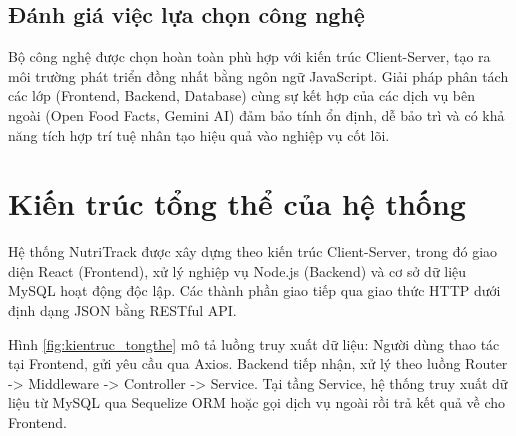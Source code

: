 \documentclass[12pt, a4paper]{report}
\begin{document}
\subsection{Đánh giá việc lựa chọn công nghệ}
Bộ công nghệ được chọn hoàn toàn phù hợp với kiến trúc Client-Server, tạo ra môi trường phát triển đồng nhất bằng ngôn ngữ JavaScript. Giải pháp phân tách các lớp (Frontend, Backend, Database) cùng sự kết hợp của các dịch vụ bên ngoài (Open Food Facts, Gemini AI) đảm bảo tính ổn định, dễ bảo trì và có khả năng tích hợp trí tuệ nhân tạo hiệu quả vào nghiệp vụ cốt lõi.

\section{Kiến trúc tổng thể của hệ thống}
Hệ thống NutriTrack được xây dựng theo kiến trúc Client-Server, trong đó giao diện React (Frontend), xử lý nghiệp vụ Node.js (Backend) và cơ sở dữ liệu MySQL hoạt động độc lập. Các thành phần giao tiếp qua giao thức HTTP dưới định dạng JSON bằng RESTful API.

Hình \ref{fig:kientruc_tongthe} mô tả luồng truy xuất dữ liệu: Người dùng thao tác tại Frontend, gửi yêu cầu qua Axios. Backend tiếp nhận, xử lý theo luồng Router -> Middleware -> Controller -> Service. Tại tầng Service, hệ thống truy xuất dữ liệu từ MySQL qua Sequelize ORM hoặc gọi dịch vụ ngoài rồi trả kết quả về cho Frontend.
\end{document}
